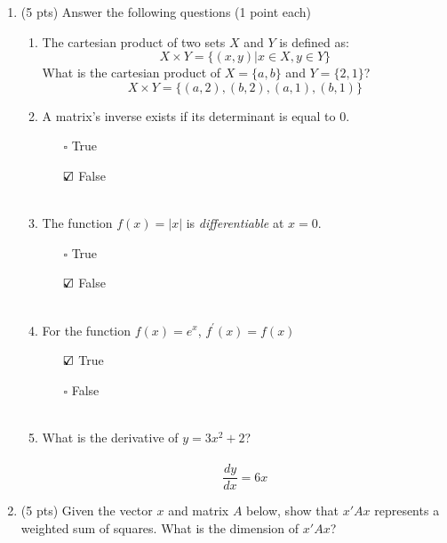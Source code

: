 \documentclass{./../../../Latex/tests}
\begin{document}
\thispagestyle{plain}

\vspace{0.5em}


\begin{enumerate}	

\item (5 pts) Answer the following questions (1 point each)
\begin{enumerate}
	\item The cartesian product of two sets $X$ and $Y$ is defined as: $$ X \times Y = \{(x,y) | x \in X, y \in Y\} $$
  	What is the cartesian product of $X=\{a,b\}$ and $Y=\{2,1\}$? \\
  	$$  X \times Y = \{ (a,2), (b,2), (a,1), (b,1) \} $$
  	\item A matrix's inverse exists if its determinant is equal to 0. 
  \begin{itemize}
  	\item[$\square$] True 
  	\item[$\text{\rlap{$\checkmark$}}\square$] False \\~\\
  \end{itemize}
  \item The function $f(x) = |x|$ is \textit{differentiable} at $x=0$.
  \begin{itemize}
  	\item[$\square$] True 
  	\item[$\text{\rlap{$\checkmark$}}\square$] False \\~\\
  \end{itemize}
    \item For the function $f(x) = e^x$, $f^{\prime} (x)=f(x)$ 
  \begin{itemize}
  	\item[$\text{\rlap{$\checkmark$}}\square$] True 
  	\item[$\square$] False \\~\\
  \end{itemize}
  \item What is the derivative of $y=3x^2+2$? \\~\\  $$ \frac{dy}{dx} =6x$$
  
\end{enumerate}


\newpage
\item (5 pts) Given the vector $x$ and matrix $A$ below, show that $x'Ax$ represents a weighted sum of squares. What is the dimension of $x'Ax$?


\end{enumerate}
\end{document}
